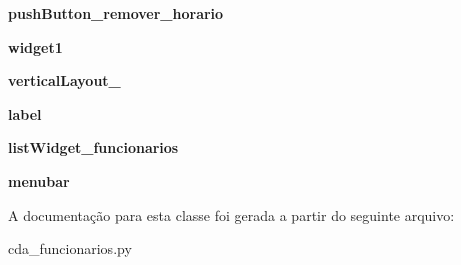 \begin{DoxyCompactItemize}
\item 
\hypertarget{classcda__funcionarios_1_1Ui__Add__Funcionarios__Window_a19e4b54dc6265bc7ea14fb78c842fa5d}{{\bfseries push\-Button\-\_\-remover\-\_\-horario}}\label{classcda__funcionarios_1_1Ui__Add__Funcionarios__Window_a19e4b54dc6265bc7ea14fb78c842fa5d}

\item 
\hypertarget{classcda__funcionarios_1_1Ui__Add__Funcionarios__Window_a351872655529107ab8d397c108f636e2}{{\bfseries widget1}}\label{classcda__funcionarios_1_1Ui__Add__Funcionarios__Window_a351872655529107ab8d397c108f636e2}

\item 
\hypertarget{classcda__funcionarios_1_1Ui__Add__Funcionarios__Window_a682aba553b558ef148afdda8eda36658}{{\bfseries vertical\-Layout\-\_}}\label{classcda__funcionarios_1_1Ui__Add__Funcionarios__Window_a682aba553b558ef148afdda8eda36658}

\item 
\hypertarget{classcda__funcionarios_1_1Ui__Add__Funcionarios__Window_aa63aa61ce36eb82e5d9523538ec278ec}{{\bfseries label}}\label{classcda__funcionarios_1_1Ui__Add__Funcionarios__Window_aa63aa61ce36eb82e5d9523538ec278ec}

\item 
\hypertarget{classcda__funcionarios_1_1Ui__Add__Funcionarios__Window_aecd22e25e25612b068ff919c498e2c22}{{\bfseries list\-Widget\-\_\-funcionarios}}\label{classcda__funcionarios_1_1Ui__Add__Funcionarios__Window_aecd22e25e25612b068ff919c498e2c22}

\item 
\hypertarget{classcda__funcionarios_1_1Ui__Add__Funcionarios__Window_a9be92872b73b8eca4611e1e2726f5e42}{{\bfseries menubar}}\label{classcda__funcionarios_1_1Ui__Add__Funcionarios__Window_a9be92872b73b8eca4611e1e2726f5e42}

\end{DoxyCompactItemize}


\-A documentação para esta classe foi gerada a partir do seguinte arquivo\-:\begin{DoxyCompactItemize}
\item 
cda\-\_\-funcionarios.\-py\end{DoxyCompactItemize}
